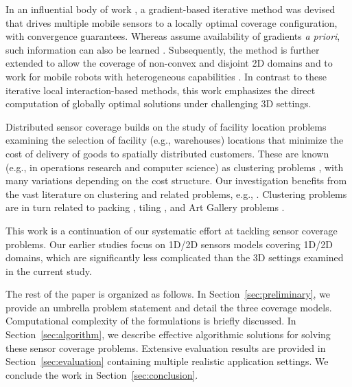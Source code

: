 In an influential body of work \cite{cortes2004coverage,martinez2007motion}, a gradient-based iterative method was devised that drives multiple mobile sensors to a locally optimal coverage configuration, with 
convergence guarantees. 
%
Whereas \cite{cortes2004coverage,martinez2007motion} assume availability of gradients {\em a priori}, such information can also be learned \cite{schwager2009decentralized}. 
%
Subsequently, the method is further extended to allow the coverage of non-convex and disjoint 2D domains \cite{schwager2009optimal} and to work for mobile robots with heterogeneous capabilities \cite{pierson2017adapting}. 
%
In contrast to these iterative local interaction-based methods, this work emphasizes the direct computation of globally optimal solutions under challenging 3D settings. 

 Distributed sensor coverage \cite{cortes2004coverage,schwager2009decentralized} builds on the study of facility location problems \cite{weber1929theory,drezner1995facility} examining the selection of facility (e.g., warehouses) locations that minimize the cost of delivery of goods to spatially distributed customers. These are known (e.g., in operations research and computer science) as clustering problems \cite{har2011geometric}, with many variations depending on the cost structure. Our investigation benefits from the vast literature on clustering and related problems, e.g., \cite{feder1988optimal,hochbaum1985best,gonzalez1985clustering,daskin2000new,shamos1975closest}.
%
Clustering problems are in turn related to packing \cite{hales2005proof}, tiling \cite{thue1910dichteste}, and Art Gallery problems \cite{o1987art,shermer1992recent}.

This work is a continuation of our systematic effort \cite{FenHanGaoYuRSS19,FenYu2020RAL,FenYuRSS20} at tackling sensor coverage problems. Our earlier studies focus on 1D/2D sensors models covering 1D/2D domains, which are significantly less complicated than the 3D settings examined in the current study.

The rest of the paper is organized as follows. In Section~\ref{sec:preliminary}, we provide an umbrella problem statement and detail the three coverage models. Computational complexity of the formulations is briefly discussed. In Section~\ref{sec:algorithm}, we describe effective algorithmic solutions for solving these sensor coverage problems. Extensive evaluation results are provided in Section~\ref{sec:evaluation} containing multiple realistic application settings. We conclude the work in Section~\ref{sec:conclusion}.